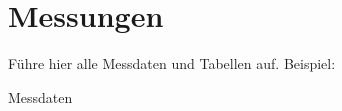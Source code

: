 \section{Messungen}
Führe hier alle Messdaten und Tabellen auf. Beispiel:

\begin{table}[h]
    \centering
    
    \caption{Messdaten}
    \label{tab:mess}
\end{table}
